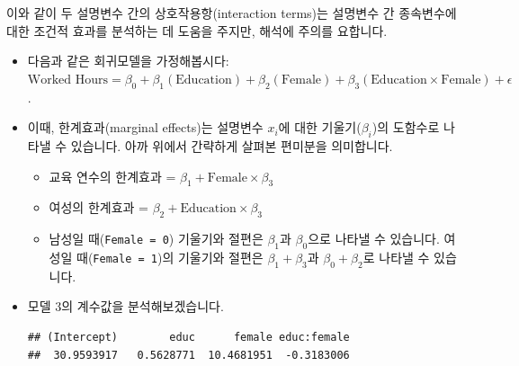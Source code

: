 \documentclass[]{book}
\newenvironment{Shaded}{\begin{snugshade}}{\end{snugshade}}
\newcommand{\CommentTok}[1]{\textcolor[rgb]{0.56,0.35,0.01}{\textit{#1}}}
\newcommand{\DataTypeTok}[1]{\textcolor[rgb]{0.13,0.29,0.53}{#1}}
\newcommand{\DecValTok}[1]{\textcolor[rgb]{0.00,0.00,0.81}{#1}}
\newcommand{\KeywordTok}[1]{\textcolor[rgb]{0.13,0.29,0.53}{\textbf{#1}}}
\newcommand{\NormalTok}[1]{#1}
\newcommand{\OperatorTok}[1]{\textcolor[rgb]{0.81,0.36,0.00}{\textbf{#1}}}
\newcommand{\StringTok}[1]{\textcolor[rgb]{0.31,0.60,0.02}{#1}}
\begin{document}
이와 같이 두 설명변수 간의 상호작용항(interaction terms)는 설명변수 간 종속변수에 대한 조건적 효과를 분석하는 데 도움을 주지만, 해석에 주의를 요합니다.

\begin{itemize}
\item
  다음과 같은 회귀모델을 가정해봅시다: \(\text{Worked Hours} = \beta_0 + \beta_1(\text{Education}) + \beta_2(\text{Female}) + \beta_3(\text{Education} \times \text{Female}) + \epsilon\).
\item
  이때, 한계효과(marginal effects)는 설명변수 \(x_i\)에 대한 기울기(\(\beta_i\))의 도함수로 나타낼 수 있습니다. 아까 위에서 간략하게 살펴본 편미분을 의미합니다.

  \begin{itemize}
  \item
    교육 연수의 한계효과 = \(\beta_1 + \text{Female} \times \beta_3\)
  \item
    여성의 한계효과 = \(\beta_2 + \text{Education} \times \beta_3\)
  \item
    남성일 때(\texttt{Female\ =\ 0}) 기울기와 절편은 \(\beta_1\)과 \(\beta_0\)으로 나타낼 수 있습니다. 여성일 때(\texttt{Female\ =\ 1})의 기울기와 절편은 \(\beta_1 + \beta_3\)과 \(\beta_0 + \beta_2\)로 나타낼 수 있습니다.
  \end{itemize}
\item
  모델 3의 계수값을 분석해보겠습니다.

\begin{Shaded}
\end{Shaded}

\begin{verbatim}
## (Intercept)        educ      female educ:female 
##  30.9593917   0.5628771  10.4681951  -0.3183006
\end{verbatim}

\begin{Shaded}
\end{Shaded}


\end{itemize}
\end{document}

